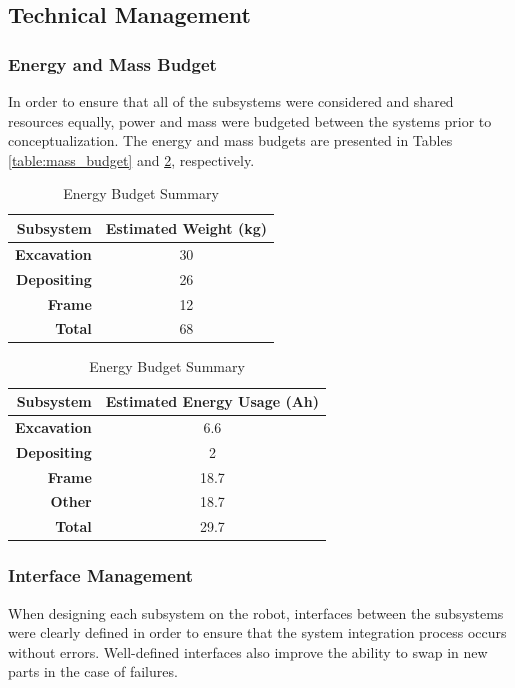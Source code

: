 \documentclass[class=article, crop=false]{standalone}
\begin{document}
	\subsection{Technical Management}
	\label{subsec:technical_management}
	
	\subsubsection{Energy and Mass Budget}
	In order to ensure that all of the subsystems were considered and shared resources equally, power and mass were budgeted between the systems prior to conceptualization. The energy and mass budgets are presented in Tables \ref{table:mass_budget} and \ref{table:energy_budget}, respectively.
	
\FloatBarrier
	\begin{table}[h]
	\scriptsize
	\parbox{.45\linewidth}{
	\centering
	\begin{tabular}{ | r | c | }
 	\hline		
 	\rowcolor[gray]{0.8}
 		\textbf{Subsystem} & \textbf{Estimated Weight (kg)} \\
 		\hline\hline
 		\textbf{Excavation} & 30 \\
 		\hline
 		\textbf{Depositing} & 26 \\
 		\hline
 		\textbf{Frame} & 12 \\
 		\hline
 		\textbf{Total} & 68 \\
 		\hline
	\end{tabular}
	\caption{Mass Budget Summary}
		\label{table:mass_budget}
	}
	\hfill
	\parbox{.45\linewidth}{
	\centering
	\begin{tabular}{ | r | c | }
 	\hline		
 	\rowcolor[gray]{0.8}
 		\textbf{Subsystem} & \textbf{Estimated Energy Usage (Ah)} \\
 		\hline\hline
 		\textbf{Excavation} & 6.6 \\
 		\hline
 		\textbf{Depositing} & 2 \\
 		\hline
 		\textbf{Frame} & 18.7 \\
 		\hline
 		\textbf{Other} & 18.7 \\
 		\hline
 		\textbf{Total} & 29.7 \\
 		\hline
	\end{tabular}
	\caption{Energy Budget Summary}
		\label{table:energy_budget}
	}
	\end{table}
	\FloatBarrier
	
	\subsubsection{Interface Management}
	When designing each subsystem on the robot, interfaces between the subsystems were clearly defined in order to ensure that the system integration process occurs without errors. Well-defined interfaces also improve the ability to swap in new parts in the case of failures.
	
\end{document}
